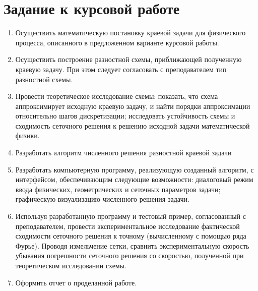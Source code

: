 
\setcounter{page}{2}



\section*{Задание к курсовой работе}
{
	\begin{enumerate}
	    \item Осуществить  математическую  постановку  краевой  задачи  для физического процесса, описанного в предложенном варианте курсовой работы.
        \item Осуществить построение разностной схемы, приближающей
полученную краевую задачу. При этом следует согласовать с преподавателем
тип разностной схемы.
        \item Провести теоретическое исследование схемы: показать, что схема
аппроксимирует исходную краевую задачу, и найти порядки аппроксимации
относительно шагов дискретизации; исследовать устойчивость схемы и
сходимость сеточного решения к решению исходной задачи математической
физики.
        \item Разработать алгоритм численного решения разностной краевой задачи
        \item Разработать компьютерную программу, реализующую созданный
алгоритм, с интерфейсом, обеспечивающим следующие возможности:
диалоговый режим ввода физических, геометрических и сеточных параметров
задачи; графическую визуализацию численного решения задачи.
        \item Используя разработанную программу и тестовый пример,
согласованный с преподавателем, провести экспериментальное исследование
фактической сходимости сеточного решения к точному (вычисленному с
помощью ряда Фурье). Проводя измельчение сетки, сравнить
экспериментальную скорость убывания погрешности сеточного решения со
скоростью, полученной при теоретическом исследовании схемы.
		\item Оформить отчет о проделанной работе.
	\end{enumerate}
}
\newpage

